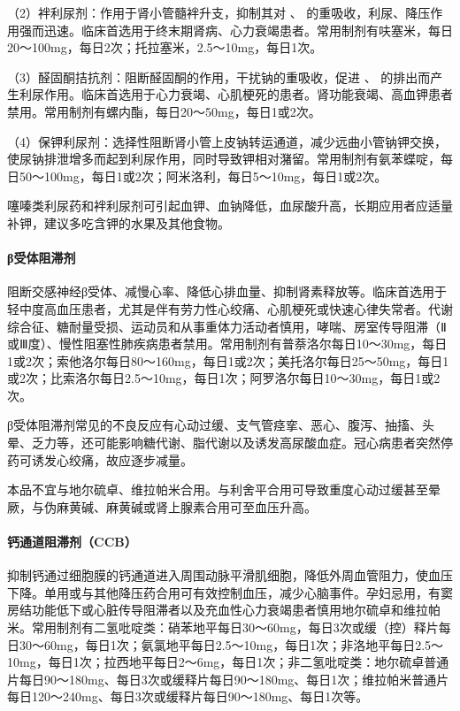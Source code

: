 （2）袢利尿剂：作用于肾小管髓袢升支，抑制其对 、
的重吸收，利尿、降压作用强而迅速。临床首选用于终末期肾病、心力衰竭患者。常用制剂有呋塞米，每日20～100mg，每日2次；托拉塞米，2.5～10mg，每日1次。

（3）醛固酮拮抗剂：阻断醛固酮的作用，干扰钠的重吸收，促进 、
的排出而产生利尿作用。临床首选用于心力衰竭、心肌梗死的患者。肾功能衰竭、高血钾患者禁用。常用制剂有螺内酯，每日20～50mg，每日1或2次。

（4）保钾利尿剂：选择性阻断肾小管上皮钠转运通道，减少远曲小管钠钾交换，使尿钠排泄增多而起到利尿作用，同时导致钾相对潴留。常用制剂有氨苯蝶啶，每日50～100mg，每日1或2次；阿米洛利，每日5～10mg，每日1或2次。

噻嗪类利尿药和袢利尿剂可引起血钾、血钠降低，血尿酸升高，长期应用者应适量补钾，建议多吃含钾的水果及其他食物。
\paragraph{β受体阻滞剂}

阻断交感神经β受体、减慢心率、降低心排血量、抑制肾素释放等。临床首选用于轻中度高血压患者，尤其是伴有劳力性心绞痛、心肌梗死或快速心律失常者。代谢综合征、糖耐量受损、运动员和从事重体力活动者慎用，哮喘、房室传导阻滞（Ⅱ或Ⅲ度）、慢性阻塞性肺疾病患者禁用。常用制剂有普萘洛尔每日10～30mg，每日1或2次；索他洛尔每日80～160mg，每日1或2次；美托洛尔每日25～50mg，每日1或2次；比索洛尔每日2.5～10mg，每日1次；阿罗洛尔每日10～30mg，每日1或2次。

β受体阻滞剂常见的不良反应有心动过缓、支气管痉挛、恶心、腹泻、抽搐、头晕、乏力等，还可能影响糖代谢、脂代谢以及诱发高尿酸血症。冠心病患者突然停药可诱发心绞痛，故应逐步减量。

本品不宜与地尔硫卓、维拉帕米合用。与利舍平合用可导致重度心动过缓甚至晕厥，与伪麻黄碱、麻黄碱或肾上腺素合用可至血压升高。
\paragraph{钙通道阻滞剂（CCB）}

抑制钙通过细胞膜的钙通道进入周围动脉平滑肌细胞，降低外周血管阻力，使血压下降。单用或与其他降压药合用可有效控制血压，减少心脑事件。孕妇忌用，有窦房结功能低下或心脏传导阻滞者以及充血性心力衰竭患者慎用地尔硫卓和维拉帕米。常用制剂有二氢吡啶类：硝苯地平每日30～60mg，每日3次或缓（控）释片每日30～60mg，每日1次；氨氯地平每日2.5～10mg，每日1次；非洛地平每日2.5～10mg，每日1次；拉西地平每日2～6mg，每日1次；非二氢吡啶类：地尔硫卓普通片每日90～180mg、每日3次或缓释片每日90～180mg、每日1次；维拉帕米普通片每日120～240mg、每日3次或缓释片每日90～180mg、每日1次等。

